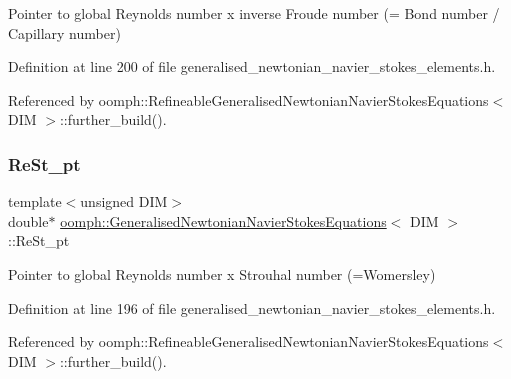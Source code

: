 Pointer to global Reynolds number x inverse Froude number (= Bond number / Capillary number) 



Definition at line 200 of file generalised\+\_\+newtonian\+\_\+navier\+\_\+stokes\+\_\+elements.\+h.



Referenced by oomph\+::\+Refineable\+Generalised\+Newtonian\+Navier\+Stokes\+Equations$<$ D\+I\+M $>$\+::further\+\_\+build().

\mbox{\label{classoomph_1_1GeneralisedNewtonianNavierStokesEquations_ae15b0e84bf6ecee5b7503c090d8cbfcc}} 
\subsubsection{\texorpdfstring{Re\+St\+\_\+pt}{ReSt\_pt}}
{\footnotesize\ttfamily template$<$unsigned D\+IM$>$ \\
double$\ast$ \hyperlink{classoomph_1_1GeneralisedNewtonianNavierStokesEquations}{oomph\+::\+Generalised\+Newtonian\+Navier\+Stokes\+Equations}$<$ D\+IM $>$\+::Re\+St\+\_\+pt\hspace{0.3cm}{\ttfamily [protected]}}



Pointer to global Reynolds number x Strouhal number (=Womersley) 



Definition at line 196 of file generalised\+\_\+newtonian\+\_\+navier\+\_\+stokes\+\_\+elements.\+h.



Referenced by oomph\+::\+Refineable\+Generalised\+Newtonian\+Navier\+Stokes\+Equations$<$ D\+I\+M $>$\+::further\+\_\+build().

\mbox{\label{classoomph_1_1GeneralisedNewtonianNavierStokesEquations_ac7c065324d62214ce4fb42f2e8040f6e}} 
